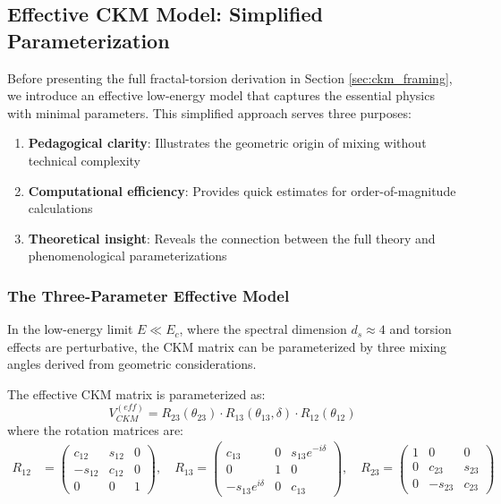 \subsection{Effective CKM Model: Simplified Parameterization}
\label{sec:ckm_effective}

Before presenting the full fractal-torsion derivation in Section \ref{sec:ckm_framing}, we introduce an effective low-energy model that captures the essential physics with minimal parameters. This simplified approach serves three purposes:

\begin{enumerate}
    \item \textbf{Pedagogical clarity}: Illustrates the geometric origin of mixing without technical complexity
    \item \textbf{Computational efficiency}: Provides quick estimates for order-of-magnitude calculations
    \item \textbf{Theoretical insight}: Reveals the connection between the full theory and phenomenological parameterizations
\end{enumerate}

\subsubsection{The Three-Parameter Effective Model}

In the low-energy limit $E \ll E_c$, where the spectral dimension $d_s \approx 4$ and torsion effects are perturbative, the CKM matrix can be parameterized by three mixing angles derived from geometric considerations.

\begin{model}
The effective CKM matrix is parameterized as:
\begin{equation}
    V_{CKM}^{(eff)} = R_{23}(\theta_{23}) \cdot R_{13}(\theta_{13}, \delta) \cdot R_{12}(\theta_{12})
\end{equation}
where the rotation matrices are:
\begin{align}
    R_{12} &= \begin{pmatrix} c_{12} & s_{12} & 0 \\ -s_{12} & c_{12} & 0 \\ 0 & 0 & 1 \end{pmatrix}, \quad
    R_{13} = \begin{pmatrix} c_{13} & 0 & s_{13}e^{-i\delta} \\ 0 & 1 & 0 \\ -s_{13}e^{i\delta} & 0 & c_{13} \end{pmatrix}, \quad
    R_{23} = \begin{pmatrix} 1 & 0 & 0 \\ 0 & c_{23} & s_{23} \\ 0 & -s_{23} & c_{23} \end{pmatrix}
\end{align}
\end{model}

